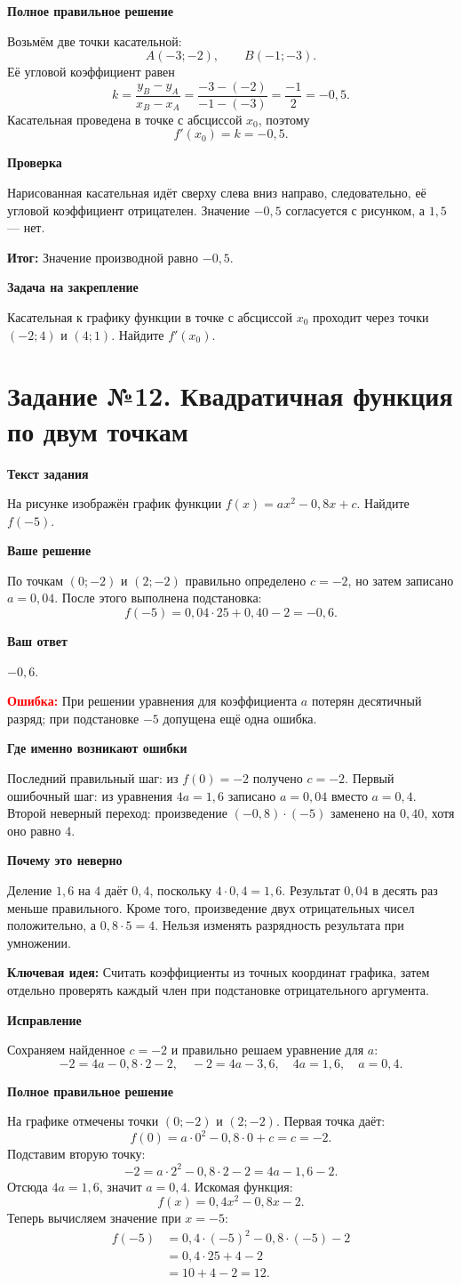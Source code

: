 \documentclass[11pt,a4paper]{article}
\newcommand{\task}[2]{\newpage\phantomsection\label{task:#1}\section*{Задание №#1. #2}}
\newcommand{\err}[1]{\par\textcolor{red}{\textbf{Ошибка:}} #1\par}
\newcommand{\keyidea}[1]{\par\textcolor{blue!60!black}{\textbf{Ключевая идея:}} #1\par}
\newcommand{\conclusion}[1]{\par\textcolor{teal!60!black}{\textbf{Итог:}} #1\par}
\newcommand{\itemhead}[1]{\par\medskip\textbf{#1}\par}
\begin{document}
\itemhead{Полное правильное решение}
Возьмём две точки касательной:
\[
A(-3;-2),\qquad B(-1;-3).
\]
Её угловой коэффициент равен
\[
k=\frac{y_B-y_A}{x_B-x_A}=
\frac{-3-(-2)}{-1-(-3)}=\frac{-1}{2}=-0{,}5.
\]
Касательная проведена в точке с абсциссой $x_0$, поэтому
\[
f'(x_0)=k=-0{,}5.
\]
\itemhead{Проверка}
Нарисованная касательная идёт сверху слева вниз направо, следовательно, её угловой коэффициент отрицателен. Значение $-0{,}5$ согласуется с рисунком, а $1{,}5$ --- нет.
\conclusion{Значение производной равно $-0{,}5$.}
\itemhead{Задача на закрепление}
Касательная к графику функции в точке с абсциссой $x_0$ проходит через точки $(-2;4)$ и $(4;1)$. Найдите $f'(x_0)$.

\task{12}{Квадратичная функция по двум точкам}
\itemhead{Текст задания}
На рисунке изображён график функции $f(x)=ax^2-0{,}8x+c$. Найдите $f(-5)$.
\itemhead{Ваше решение}
По точкам $(0;-2)$ и $(2;-2)$ правильно определено $c=-2$, но затем записано $a=0{,}04$. После этого выполнена подстановка:
\[
f(-5)=0{,}04\cdot25+0{,}40-2=-0{,}6.
\]
\itemhead{Ваш ответ}
$-0{,}6$.
\err{При решении уравнения для коэффициента $a$ потерян десятичный разряд; при подстановке $-5$ допущена ещё одна ошибка.}
\itemhead{Где именно возникают ошибки}
Последний правильный шаг: из $f(0)=-2$ получено $c=-2$.
Первый ошибочный шаг: из уравнения $4a=1{,}6$ записано $a=0{,}04$ вместо $a=0{,}4$.
Второй неверный переход: произведение $(-0{,}8)\cdot(-5)$ заменено на $0{,}40$, хотя оно равно $4$.
\itemhead{Почему это неверно}
Деление $1{,}6$ на $4$ даёт $0{,}4$, поскольку $4\cdot0{,}4=1{,}6$. Результат $0{,}04$ в десять раз меньше правильного.
Кроме того, произведение двух отрицательных чисел положительно, а $0{,}8\cdot5=4$. Нельзя изменять разрядность результата при умножении.
\keyidea{Считать коэффициенты из точных координат графика, затем отдельно проверять каждый член при подстановке отрицательного аргумента.}
\itemhead{Исправление}
Сохраняем найденное $c=-2$ и правильно решаем уравнение для $a$:
\[
-2=4a-0{,}8\cdot2-2,\quad -2=4a-3{,}6,
\quad 4a=1{,}6,\quad a=0{,}4.
\]
\itemhead{Полное правильное решение}
На графике отмечены точки $(0;-2)$ и $(2;-2)$.
Первая точка даёт:
\[
f(0)=a\cdot0^2-0{,}8\cdot0+c=c=-2.
\]
Подставим вторую точку:
\[
-2=a\cdot2^2-0{,}8\cdot2-2
=4a-1{,}6-2.
\]
Отсюда $4a=1{,}6$, значит $a=0{,}4$.
Искомая функция:
\[
f(x)=0{,}4x^2-0{,}8x-2.
\]
Теперь вычисляем значение при $x=-5$:
\[
\begin{aligned}
f(-5)&=0{,}4\cdot(-5)^2-0{,}8\cdot(-5)-2\\
&=0{,}4\cdot25+4-2\\
&=10+4-2=12.
\end{aligned}
\]
\end{document}
